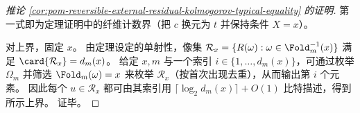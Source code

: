 \begin{proof}[推论 \ref{cor:pom-reversible-external-residual-kolmogorov-typical-equality} 的证明]
第一式即为定理证明中的纤维计数界（把 \(c\) 换元为 \(t\) 并保持条件 \(X=x\)）。
\par
对上界，固定 \(x\)。
由定理设定的单射性，像集 \(\mathcal R_x=\{R(\omega):\omega\in\Fold_m^{-1}(x)\}\) 满足 \(\card{\mathcal R_x}=d_m(x)\)。
给定 \(x,m\) 与一个索引 \(i\in\{1,\dots,d_m(x)\}\)，可通过枚举 \(\Omega_m\) 并筛选 \(\Fold_m(\omega)=x\) 来枚举 \(\mathcal R_x\)（按首次出现去重），从而输出第 \(i\) 个元素。
因此每个 \(u\in\mathcal R_x\) 都可由其索引用 \(\lceil\log_2 d_m(x)\rceil+O(1)\) 比特描述，得到所示上界。
证毕。
\end{proof}

\endinput

